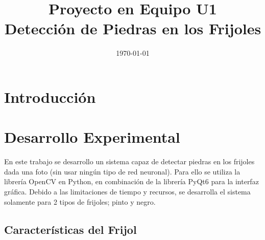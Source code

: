 \documentclass[conference]{IEEEtran}
\date{\specialdate\today}
\begin{document}
\newcommand{\breite}{0.9} %
\newcommand{\RelacionFiguradoscolumnas}{0.9}
\newcommand{\RelacionFiguradoscolumnasPuntoCinco}{0.45}

\title{Proyecto en Equipo U1 \\ Detección de Piedras en los Frijoles}

\author{
}

\maketitle

\begin{abstract} 
    
\end{abstract}

\section{Introducción}

\section{Desarrollo Experimental}
    En este trabajo se desarrollo un sistema capaz de detectar piedras en los frijoles dada una foto (sin usar ningún tipo de red neuronal). Para ello se utiliza la librería OpenCV\cite{opencv} en Python\cite{python}, en combinación de la librería PyQt6\cite{pyqt6} para la interfaz gráfica.
    Debido a las limitaciones de tiempo y recursos, se desarrolla el sistema solamente para 2 tipos de frijoles; pinto y negro. 

    \subsection{Características del Frijol}
\end{document}
